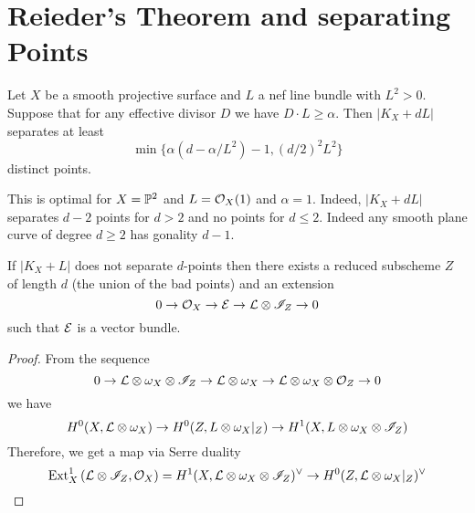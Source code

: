 \documentclass[12pt]{article}
\begin{document}
\section{Reieder's Theorem and separating Points}

\begin{theorem}
Let $X$ be a smooth projective surface and $L$ a nef line bundle with $L^2 > 0$. Suppose that for any effective divisor $D$ we have $D \cdot L \ge \alpha$. Then $|K_X + d L|$ separates at least
\[ \min \{ \alpha (d - \alpha / L^2) - 1, (d/2)^2 L^2 \} \]
distinct points.
\end{theorem}

\begin{rmk}
This is optimal for $X = \P^2$ and $L = \struct{X}(1)$ and $\alpha = 1$. Indeed, $|K_X + d L|$ separates $d - 2$ points for $d > 2$ and no points for $d \le 2$. Indeed any smooth plane curve of degree $d \ge 2$ has gonality $d - 1$. 
\end{rmk}

\begin{lemma}
If $|K_X + L|$ does not separate $d$-points then there exists a reduced subscheme $Z$ of length $d$ (the union of the bad points) and an extension
\[ 0 \to \struct{X} \to \E \to \L \ot \I_Z \to 0 \]
such that $\E$ is a vector bundle. 
\end{lemma}

\begin{proof}
From the sequence
\[ 0 \to \L \ot \omega_X \ot \I_Z \to \L \ot \omega_X \to \L \ot \omega_X \ot \struct{Z} \to 0 \]
we have
\[ H^0(X, \L \ot \omega_X) \to H^0(Z, L \ot \omega_X|_Z) \to H^1(X, L \ot \omega_X \ot \I_Z) \]
Therefore, we get a map via Serre duality 
\[ \Ext{1}{X}{\L \ot \I_Z}{\struct{X}} = H^1(X, \L \ot \omega_X \ot \I_Z)^\vee \to H^0(Z, \L \ot \omega_X|_Z)^\vee \]
\end{proof}
\end{document}
